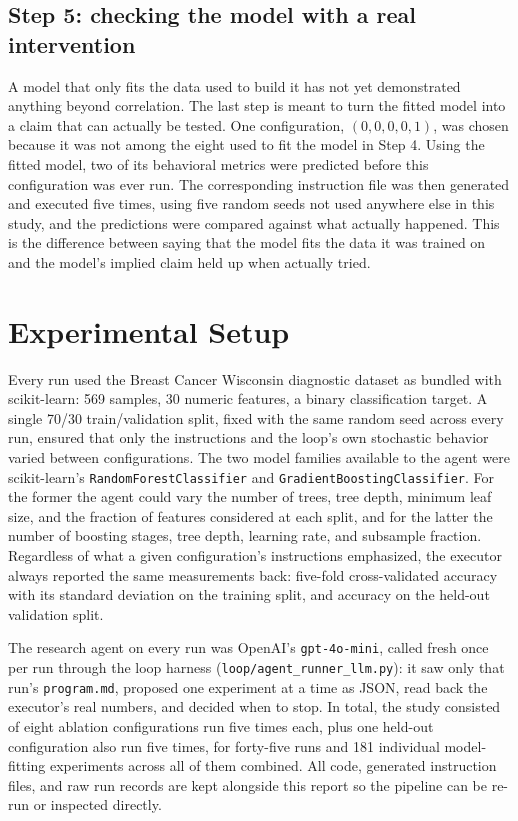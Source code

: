 \documentclass[11pt]{article}
\begin{document}
\subsection{Step 5: checking the model with a real intervention}
\label{sec:validation}

A model that only fits the data used to build it has not yet demonstrated anything beyond correlation. The last step is meant to turn the fitted model into a claim that can actually be tested. One configuration, $(0,0,0,0,1)$, was chosen because it was not among the eight used to fit the model in Step 4. Using the fitted model, two of its behavioral metrics were predicted before this configuration was ever run. The corresponding instruction file was then generated and executed five times, using five random seeds not used anywhere else in this study, and the predictions were compared against what actually happened. This is the difference between saying that the model fits the data it was trained on and the model's implied claim held up when actually tried.

\section{Experimental Setup}
\label{sec:setup}

Every run used the Breast Cancer Wisconsin diagnostic dataset as bundled with scikit-learn: 569 samples, 30 numeric features, a binary classification target. A single 70/30 train/validation split, fixed with the same random seed across every run, ensured that only the instructions and the loop's own stochastic behavior varied between configurations. The two model families available to the agent were scikit-learn's \texttt{RandomForestClassifier} and \texttt{GradientBoostingClassifier}. For the former the agent could vary the number of trees, tree depth, minimum leaf size, and the fraction of features considered at each split, and for the latter the number of boosting stages, tree depth, learning rate, and subsample fraction. Regardless of what a given configuration's instructions emphasized, the executor always reported the same measurements back: five-fold cross-validated accuracy with its standard deviation on the training split, and accuracy on the held-out validation split.

The research agent on every run was OpenAI's \texttt{gpt-4o-mini}, called fresh once per run through the loop harness (\texttt{loop/agent\_runner\_llm.py}): it saw only that run's \texttt{program.md}, proposed one experiment at a time as JSON, read back the executor's real numbers, and decided when to stop. In total, the study consisted of eight ablation configurations run five times each, plus one held-out configuration also run five times, for forty-five runs and 181 individual model-fitting experiments across all of them combined. All code, generated instruction files, and raw run records are kept alongside this report so the pipeline can be re-run or inspected directly.
\end{document}
